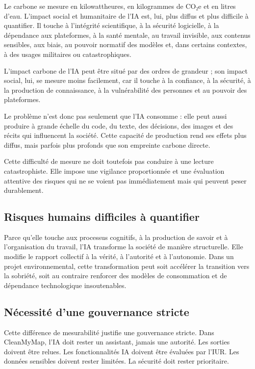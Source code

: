 \documentclass[
  10pt,
  a4paper,
  DIV=11,
  numbers=noendperiod,
  oneside]{scrreprt}
\begin{document}
Le carbone se mesure en kilowattheures, en kilogrammes de CO₂e et en
litres d'eau. L'impact social et humanitaire de l'IA est, lui, plus
diffus et plus difficile à quantifier. Il touche à l'intégrité
scientifique, à la sécurité logicielle, à la dépendance aux plateformes,
à la santé mentale, au travail invisible, aux contenus sensibles, aux
biais, au pouvoir normatif des modèles et, dans certains contextes, à
des usages militaires ou catastrophiques.

L'impact carbone de l'IA peut être situé par des ordres de grandeur ;
son impact social, lui, se mesure moins facilement, car il touche à la
confiance, à la sécurité, à la production de connaissance, à la
vulnérabilité des personnes et au pouvoir des plateformes.

Le problème n'est donc pas seulement que l'IA consomme : elle peut aussi
produire à grande échelle du code, du texte, des décisions, des images
et des récits qui influencent la société. Cette capacité de production
rend ses effets plus diffus, mais parfois plus profonds que son
empreinte carbone directe.

Cette difficulté de mesure ne doit toutefois pas conduire à une lecture
catastrophiste. Elle impose une vigilance proportionnée et une
évaluation attentive des risques qui ne se voient pas immédiatement mais
qui peuvent peser durablement.

\subsection{Risques humains difficiles à
quantifier}\label{risques-humains-difficiles-uxe0-quantifier}

Parce qu'elle touche aux processus cognitifs, à la production de savoir
et à l'organisation du travail, l'IA transforme la société de manière
structurelle. Elle modifie le rapport collectif à la vérité, à
l'autorité et à l'autonomie. Dans un projet environnemental, cette
transformation peut soit accélérer la transition vers la sobriété, soit
au contraire renforcer des modèles de consommation et de dépendance
technologique insoutenables.

\subsection{Nécessité d'une gouvernance
stricte}\label{nuxe9cessituxe9-dune-gouvernance-stricte}

Cette différence de mesurabilité justifie une gouvernance stricte. Dans
CleanMyMap, l'IA doit rester un assistant, jamais une autorité. Les
sorties doivent être relues. Les fonctionnalités IA doivent être
évaluées par l'IUR. Les données sensibles doivent rester limitées. La
sécurité doit rester prioritaire.
\end{document}
